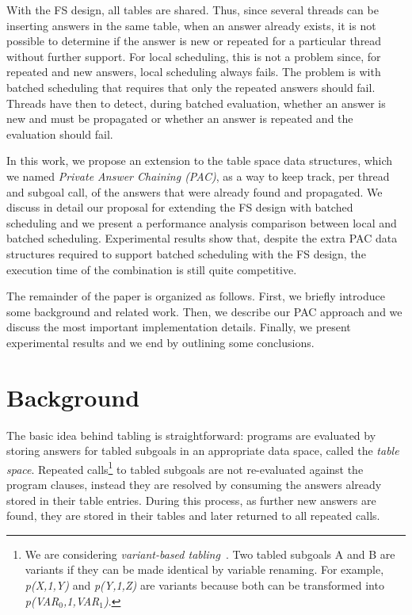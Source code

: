 \documentclass{llncs}
\begin{document}
With the FS design, all tables are shared. Thus, since several threads
can be inserting answers in the same table, when an answer already
exists, it is not possible to determine if the answer is new or
repeated for a particular thread without further support. For local
scheduling, this is not a problem since, for repeated and new answers,
local scheduling always fails. The problem is with batched scheduling
that requires that only the repeated answers should fail. Threads have
then to detect, during batched evaluation, whether an answer is new
and must be propagated or whether an answer is repeated and the
evaluation should fail.

In this work, we propose an extension to the table space data
structures, which we named \emph{Private Answer Chaining (PAC)}, as a
way to keep track, per thread and subgoal call, of the answers that
were already found and propagated. We discuss in detail our proposal
for extending the FS design with batched scheduling and we present a
performance analysis comparison between local and batched
scheduling. Experimental results show that, despite the extra PAC data
structures required to support batched scheduling with the FS design,
the execution time of the combination is still quite competitive.

The remainder of the paper is organized as follows. First, we briefly
introduce some background and related work. Then, we describe our PAC
approach and we discuss the most important implementation
details. Finally, we present experimental results and we end by
outlining some conclusions.


\section{Background}

The basic idea behind tabling is straightforward: programs are
evaluated by storing answers for tabled subgoals in an appropriate
data space, called the \emph{table space}. Repeated calls\footnote{We
  are considering \emph{variant-based
    tabling}~\cite{RamakrishnanIV-99}. Two tabled subgoals A and B are
  variants if they can be made identical by variable renaming. For
  example, \emph{p(X,1,Y)} and \emph{p(Y,1,Z)} are variants because
  both can be transformed into \emph{p(VAR$_0$,1,VAR$_1$)}.} to tabled
subgoals are not re-evaluated against the program clauses, instead
they are resolved by consuming the answers already stored in their
table entries. During this process, as further new answers are found,
they are stored in their tables and later returned to all repeated
calls.
\end{document}
